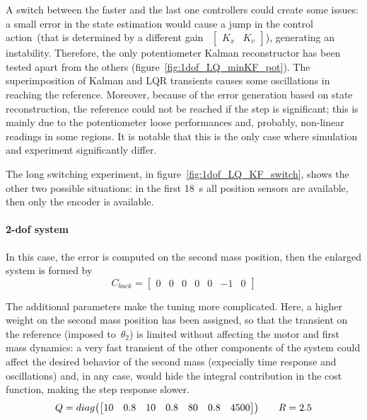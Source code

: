A switch between the faster and the last one controllers could create some issues: a small error in the state estimation would cause a jump in the control action~(that is determined by a different gain~
$
\begin{bmatrix}
	K_x & K_v
\end{bmatrix}
$), generating an instability. Therefore, the only potentiometer Kalman reconstructor has been tested apart from the others (figure~\ref{fig:1dof_LQ_minKF_pot}). The superimposition of Kalman and LQR transients causes some oscillations in reaching the reference. Moreover, because of the error generation based on state reconstruction, the reference could not be reached if the step is significant; this is mainly due to the potentiometer loose performances and, probably, non-linear readings in some regions. It is notable that this is the only case where simulation and experiment significantly differ.

The long switching experiment, in figure~\ref{fig:1dof_LQ_KF_switch}, shows the other two possible situations: in the first 18~s all position sensors are available, then only the encoder is available.

\paragraph{\acrshort{2-dof} system}

In this case, the error is computed on the second mass position, then the enlarged system is formed by
\begin{equation}
	C_{back} =
	\begin{bmatrix}
		0 & 0 & 0 & 0 & 0 & -1 & 0
	\end{bmatrix}
\end{equation}

The additional parameters make the tuning more complicated. Here, a higher weight on the second mass position has been assigned, so that the transient on the reference (imposed to~$\theta_2$) is limited without affecting the motor and first mass dynamics: a very fast transient of the other components of the system could affect the desired behavior of the second mass (expecially time response and oscillations) and, in any case, would hide the integral contribution in the cost function, making the step response slower.
\begin{equation}
	Q = diag
	\bigl{(}
	\begin{bmatrix}
		10 & 0.8 & 10 & 0.8 & 80 & 0.8 & 4500
	\end{bmatrix}
	\bigr{)}
	\qquad
	R = 2.5
\end{equation}

